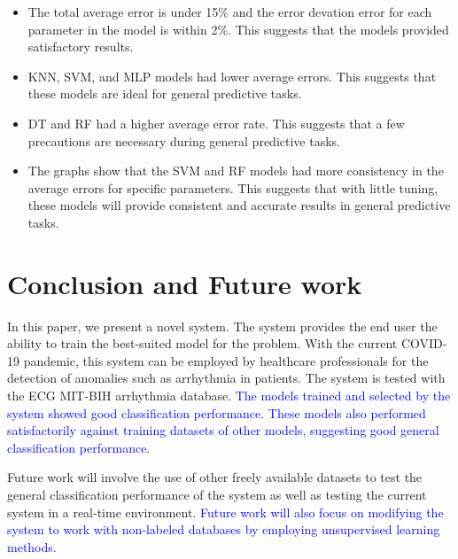 \documentclass[a4paper,fleqn]{cas-dc}
\newcommand{\responsemodsm}[1]{\textcolor{blue}{#1}}
\begin{document}
{    \begin{itemize}
        \item The total average error is under 15\% and the error devation error for each parameter in the model is within 2\%. This suggests that the models provided satisfactory results.
        \item KNN, SVM, and MLP models had lower average errors. This suggests that these models are ideal for general predictive tasks.
        \item DT and RF had a higher average error rate. This suggests that a few precautions are necessary during general predictive tasks.
        \item The graphs show that the SVM and RF models had more consistency in the average errors for specific parameters. This suggests that with little tuning, these models will provide consistent and accurate results in general predictive tasks.
    \end{itemize}

}

% 
\section{Conclusion and Future work} \label{sec:conclusion_and_future_work}
In this paper, we present a novel system. The system provides the end user the ability to train the best-suited model for the problem. With the current COVID-19 pandemic, this system can be employed by healthcare professionals for the detection of anomalies such as arrhythmia in patients. The system is tested with the ECG MIT-BIH arrhythmia database. \responsemodsm{The models trained and selected by the system showed good classification performance. These models also performed satisfactorily against training datasets of other models, suggesting good general classification performance.}

Future work will involve the use of other freely available datasets to test the general classification performance of the system as well as testing the current system in a real-time environment. \responsemodsm{Future work will also focus on modifying the system to work with non-labeled databases by employing unsupervised learning methods.}

% 
\clearpage
\end{document}
